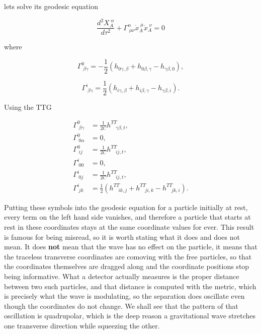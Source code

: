         lets solve its geodesic equation

        \begin{equation}
            \frac{d^2X_A^{\;\alpha}}{d\tau^2} + \Gamma^{\alpha}_{\;\mu\nu}\Dot{x}_A^{\;\mu}\Dot{x}_A^{\;\nu}=0
        \end{equation}

        where

        \begin{equation}
            \Gamma^0_{\;\beta\gamma}=-\frac{1}{2}\left(h_{0\gamma,\beta} + h_{0\beta,\gamma}-h_{\gamma\beta,0} \right),
        \end{equation}

        \begin{equation}
            \Gamma^i_{\;\beta\gamma}=\frac{1}{2}\left(h_{i\gamma,\beta} + h_{i\beta,\gamma} - h_{\gamma\beta,i} \right).
        \end{equation}

        Using the TTG

        \begin{align}
            \Gamma^0_{\;\beta\gamma}&=\frac{1}{2C}h^{TT}_{\quad\gamma\beta,t},\\
            \Gamma^0_{\;0\alpha}&=0,\\
            \Gamma^0_{\;ij}&=\frac{1}{2C}h^{TT}_{\quad ij,t},\\
            \Gamma^i_{\;00}&=0,\\
            \Gamma^i_{\;0j}&=\frac{1}{2C}h^{TT}_{\quad ij,t},\\
            \Gamma^i_{\;jk}&=\frac{1}{2}\left(h^{TT}_{\quad ik,j} + h^{TT}_{\quad ji,k}  - h^{TT}_{\quad jk,i}\right).
        \end{align}

        Putting these symbols into the geodesic equation for a particle initially at rest, every term on the left hand side vanishes, and therefore a particle that starts at rest in these coordinates stays at the same coordinate values for ever. This result is famous for being misread, so it is worth stating what it does and does not mean. It does \textbf{not} mean that the wave has no effect on the particle, it means that the traceless transverse coordinates are comoving with the free particles, so that the coordinates themselves are dragged along and the coordinate positions stop being informative. What a detector actually measures is the proper distance between two such particles, and that distance is computed with the metric, which is precisely what the wave is modulating, so the separation does oscillate even though the coordinates do not change. We shall see that the pattern of that oscillation is quadrupolar, which is the deep reason a gravitational wave stretches one transverse direction while squeezing the other.

